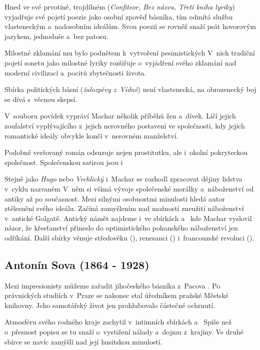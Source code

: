 Hned ve své prvotině, trojdílném 
(\emph{Confiteor, Bez názvu, Třetí kniha lyriky}) vyjadřuje své pojetí
poezie jako osobní zpověď básníka, tím odmítá službu vlasteneckým
a~nadosobním ideálům. Svou poezii se rovněž snaží psát hovorovým
jazykem, jednoduše a~bez patosu.

Milostné zklamání mu bylo podnětem k~vytvoření pesimistických  V~nich tradiční pojetí sonetu jako milostné lyriky
rozšiřuje o~vyjádření svého zklamání nad moderní civilizací a~pocitů
zbytečnosti života. 

Sbírka politických básní  (\emph{žalozpěvy
z~Vídně}) není vlastenecká, na obrozenecký boj se dívá s~věcnou skepsí.

V~souboru povídek  vypráví Machar několik
příběhů žen a~dívek. Líčí jejich zoufalství vyplývajícího z~jejich
nerovného postavení ve společnosti, kdy jejich romantické ideály obvykle
končí v~nerovném manželství.

Podobně veršovaný román  odsuzuje nejen prostitutku, ale
i~okolní pokryteckou společnost. Společenskou satirou jsou i~

Stejně jako \emph{Hugo} nebo \emph{Vrchlický} i~Machar se rozhodl
zpracovat dějiny lidstva v~cyklu nazvaném  V~něm si
všímá vývoje společenské morálky a~náboženství od antiky až po
současnost. Mezi silnými osobnostmi minulosti hledá autor ztělesnění
svého ideálu. Začíná zamyšlením nad možností zneužití náboženství
v~antické Golgatě. Antický námět najdeme i~ve sbírkách  a~ kde Machar vyslovil názor, že
křesťanství přineslo do optimistického pohanského náboženství jen
odříkání. Další sbírky věnuje středověku (), renesanci
() i~francouzské revoluci ().

\subsection*{Antonín Sova (1864 - 1928)}
Mezi impresionisty můžeme zařadit jihočeského básníka z~Pacova
. Po právnických studiích v~Praze se
nakonec stal úředníkem pražské Městské knihovny. Jeho samotářský život
jen prohlubovalo částečné ochrnutí.

Atmosféru svého rodného kraje zachytil v~intimních sbírkách  a~ Spíše než o~přesnost popisu se
tu snaží o~vystižení nálady a~dojmu z~krajiny. Ve druhé sbírce se navíc
zamýšlí nad její husitskou minulostí.

